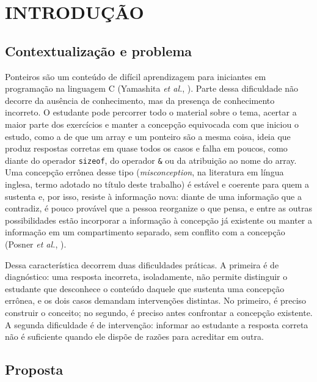 
\chapter{\texorpdfstring{\mbox{INTRODUÇÃO}}{INTRODUÇÃO}}\label{cap:1}

\section{Contextualização e problema}

Ponteiros são um conteúdo de difícil aprendizagem para iniciantes em programação na linguagem C (Yamashita \textit{et al.}, \citeyear{yamashita2017}). Parte dessa dificuldade não decorre da ausência de conhecimento, mas da presença de conhecimento incorreto. O estudante pode percorrer todo o material sobre o tema, acertar a maior parte dos exercícios e manter a concepção equivocada com que iniciou o estudo, como a de que um array e um ponteiro são a mesma coisa, ideia que produz respostas corretas em quase todos os casos e falha em poucos, como diante do operador \texttt{sizeof}, do operador \texttt{\&} ou da atribuição ao nome do array. Uma concepção errônea desse tipo (\textit{misconception}, na literatura em língua inglesa, termo adotado no título deste trabalho) é estável e coerente para quem a sustenta e, por isso, resiste à informação nova: diante de uma informação que a contradiz, é pouco provável que a pessoa reorganize o que pensa, e entre as outras possibilidades estão incorporar a informação à concepção já existente ou manter a informação em um compartimento separado, sem conflito com a concepção (Posner \textit{et al.}, \citeyear{posner1982}).

Dessa característica decorrem duas dificuldades práticas. A primeira é de diagnóstico: uma resposta incorreta, isoladamente, não permite distinguir o estudante que desconhece o conteúdo daquele que sustenta uma concepção errônea, e os dois casos demandam intervenções distintas. No primeiro, é preciso construir o conceito; no segundo, é preciso antes confrontar a concepção existente. A segunda dificuldade é de intervenção: informar ao estudante a resposta correta não é suficiente quando ele dispõe de razões para acreditar em outra.

\section{Proposta}

